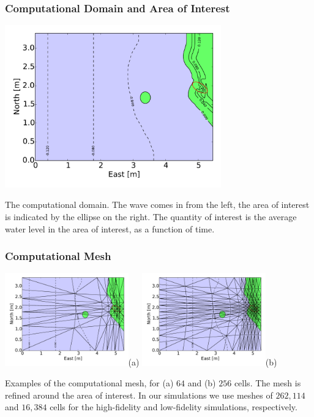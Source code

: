 \documentclass[11pt,ucs]{beamer}
\begin{document}
\begin{frame}\frametitle{Computational Domain and Area of Interest}

\begin{center}
\includegraphics[width=0.7\textwidth]{problem_setup_geometry}
\end{center}


\small{
The computational domain. The wave comes in from the left, the area of interest is indicated by the ellipse on the right. The quantity of interest is the average water level in the area of interest, as a function of time. }

\end{frame}

\begin{frame}\frametitle{Computational Mesh}

\begin{center}
\includegraphics[width=0.4\textwidth]{problem_setup_mesh_64}\textsf{(a)}
\includegraphics[width=0.4\textwidth]{problem_setup_mesh_256}\textsf{(b)}
\end{center}

\small{
Examples of the computational mesh, for (a) $64$ and (b) $256$ cells. The mesh is refined around the area of interest. In our simulations we use meshes of $262,\!114$ and $16,\!384$ cells for the high-fidelity and low-fidelity simulations, respectively.}

\end{frame}
\end{document}
